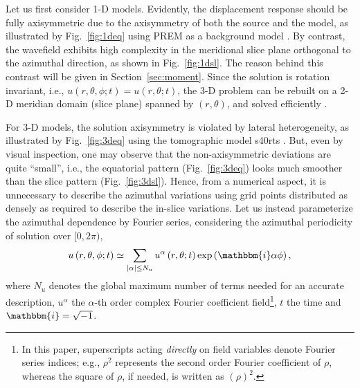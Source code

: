 \documentclass[extra]{gji}
\begin{document}
Let us first consider 1-D models. Evidently, the displacement response 
should be fully axisymmetric due to the axisymmetry of both the source 
and the model, as illustrated by Fig.~\ref{fig:1deq} using PREM as a 
background model \cite[]{dziewonski1981prem}.
By contrast, the wavefield exhibits high complexity in the meridional 
slice plane orthogonal to the azimuthal direction, as shown in Fig.~\ref{fig:1dsl}. 
The reason behind this contrast will be given in Section~\ref{sec:moment}.
Since the solution is rotation invariant, i.e., 
$u\left(r,\theta,\phi; t\right)=u\left(r,\theta; t\right)$, 
the 3-D problem can be rebuilt on a 2-D meridian domain (slice plane)
spanned by $\left(r,\theta\right)$, 
and solved efficiently \cite[]{nissen2014axisem}. 

For 3-D models, the solution axisymmetry is violated by lateral 
heterogeneity, as illustrated by Fig.~\ref{fig:3deq}
using the tomographic model s40rts 
\cite[]{ritsema2011s40rts}. But, even by visual inspection, 
one may observe that the non-axisymmetric deviations are quite ``small'', 
i.e., the equatorial pattern (Fig.~\ref{fig:3deq}) looks much smoother 
than the slice pattern (Fig.~\ref{fig:3dsl}). 
Hence, from a numerical aspect, it is unnecessary to describe the azimuthal 
variations using grid points distributed as densely as required to 
describe the in-slice variations. Let us instead parameterize 
the azimuthal dependence by Fourier series, considering the azimuthal
periodicity of solution over $[0,2\pi)$, 
\begin{equation}  
  u\left(r,\theta,\phi;t\right) \simeq \sum_{|\alpha| \le N_u} 
  u^\alpha\left(r,\theta;t\right)\exp\left(\mathbbm{i}\alpha\phi\right),
  \label{eq:demo}
\end{equation}
where $N_u$ denotes the global maximum number of terms needed for an accurate 
description, $u^\alpha$ the $\alpha$-th order complex Fourier coefficient 
field\footnote{In this paper, superscripts acting \textit{directly} on 
field variables denote Fourier series indices; e.g., $\rho^2$ represents the 
second order Fourier coefficient of $\rho$, whereas the square of $\rho$, if
needed, is written as $\left(\rho\right)^2$.}, 
$t$ the time and $\mathbbm{i}=\sqrt{-1}$. 
\end{document}
